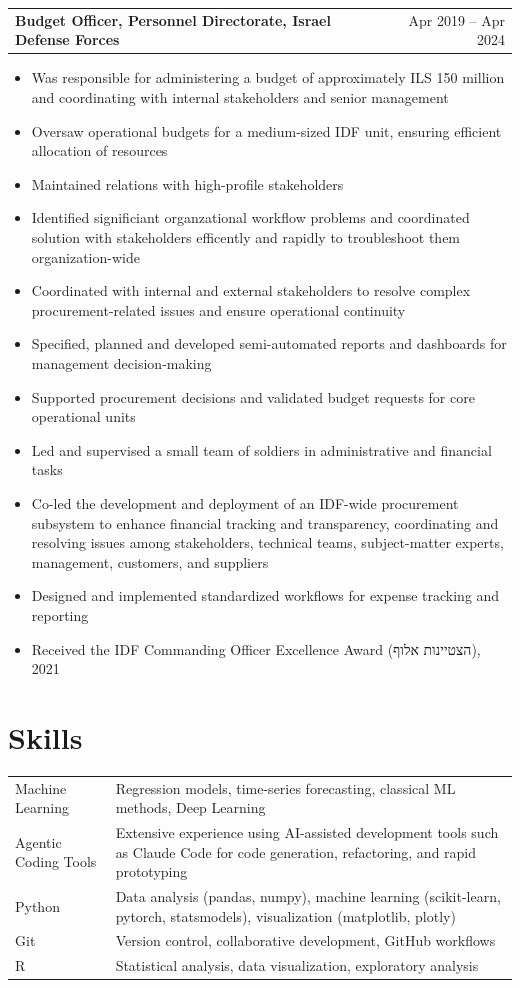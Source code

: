 \documentclass[a4paper,12pt]{article}
\makeatletter
\newenvironment{joblong}[2]
    {
    \begin{tabularx}{\linewidth}{@{}l X r@{}}
    \textbf{#1} & \hfill &  #2 \\[3.75pt]
    \end{tabularx}
    \begin{minipage}[t]{\linewidth}
    \begin{itemize}[nosep,after=\strut, leftmargin=1em, itemsep=3pt,label=--]
    }
    {
    \end{itemize}
    \end{minipage}    
    }
\makeatother
\begin{document}
\begin{joblong}{Budget Officer, Personnel Directorate, Israel Defense Forces}{Apr 2019 -- Apr 2024}
    \item Was responsible for administering a budget of approximately ILS 150 million and coordinating with internal stakeholders and senior management
    \item Oversaw operational budgets for a medium-sized IDF unit, ensuring efficient allocation of resources
    \item Maintained relations with high-profile stakeholders
    \item Identified significiant organzational workflow problems and coordinated solution with stakeholders efficently and rapidly to troubleshoot them organization-wide
    \item Coordinated with internal and external stakeholders to resolve complex procurement-related issues and ensure operational continuity
    \item Specified, planned and developed semi-automated reports and dashboards for management decision-making
    \item Supported procurement decisions and validated budget requests for core operational units
    \item Led and supervised a small team of soldiers in administrative and financial tasks
    \item Co-led the development and deployment of an IDF-wide procurement subsystem to enhance financial tracking and transparency, coordinating and resolving issues among stakeholders, technical teams, subject-matter experts, management, customers, and suppliers
    \item Designed and implemented standardized workflows for expense tracking and reporting
    \item Received the IDF Commanding Officer Excellence Award (\texthebrew{הצטיינות אלוף}), 2021
\end{joblong}

\section{Skills}
\begin{tabularx}{\linewidth}{@{}l X@{}}
Machine Learning & Regression models, time-series forecasting, classical ML methods, Deep Learning \\
Agentic Coding Tools & Extensive experience using AI-assisted development tools such as Claude Code for code generation, refactoring, and rapid prototyping \\
Python  & Data analysis (pandas, numpy), machine learning (scikit-learn, pytorch, statsmodels), visualization (matplotlib, plotly) \\  
Git     & Version control, collaborative development, GitHub workflows \\  
R       & Statistical analysis, data visualization, exploratory analysis \\  
\end{tabularx}

\vfill
{}
\end{document}
